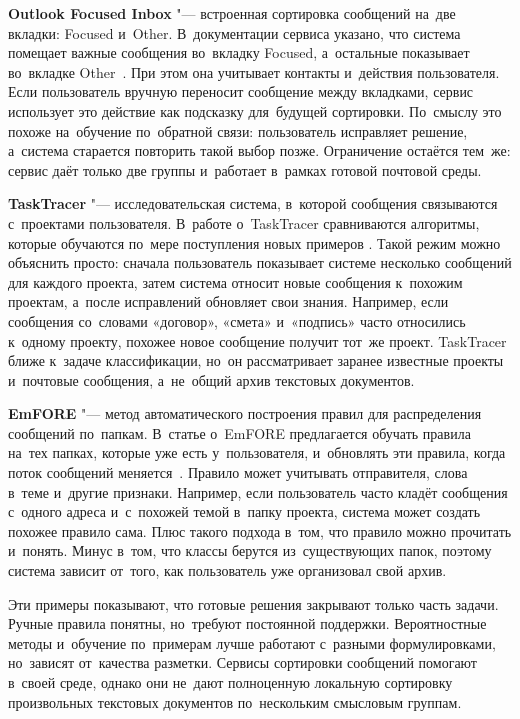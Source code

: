 \textbf{Outlook Focused Inbox} "--- встроенная сортировка сообщений на~две
вкладки: Focused и~Other. В~документации сервиса указано, что система
помещает важные сообщения во~вкладку Focused, а~остальные показывает
во~вкладке Other~\autocite{Microsoft2024FocusedInbox}. При этом она учитывает
контакты и~действия пользователя. Если пользователь вручную переносит
сообщение между вкладками, сервис использует это действие как подсказку
для~будущей сортировки. По~смыслу это похоже на~обучение по~обратной связи:
пользователь исправляет решение, а~система старается повторить такой выбор
позже. Ограничение остаётся тем~же: сервис даёт только две группы и~работает
в~рамках готовой почтовой среды.

\textbf{TaskTracer} "--- исследовательская система, в~которой сообщения
связываются с~проектами пользователя. В~работе о~TaskTracer сравниваются
алгоритмы, которые обучаются по~мере поступления новых примеров
\autocite{Keiser2009TaskTracer}. Такой режим можно объяснить просто: сначала
пользователь показывает системе несколько сообщений для каждого проекта, затем
система относит новые сообщения к~похожим проектам, а~после исправлений
обновляет свои знания. Например, если сообщения со~словами «договор»,
«смета» и~«подпись» часто относились к~одному проекту, похожее новое сообщение
получит тот~же проект. TaskTracer ближе к~задаче классификации, но~он
рассматривает заранее известные проекты и~почтовые сообщения, а~не~общий
архив текстовых документов.

\textbf{EmFORE} "--- метод автоматического построения правил для распределения
сообщений по~папкам. В~статье о~EmFORE предлагается обучать правила на~тех
папках, которые уже есть у~пользователя, и~обновлять эти правила, когда поток
сообщений меняется~\autocite{Singh2023EmFORE}. Правило может учитывать
отправителя, слова в~теме и~другие признаки. Например, если пользователь часто кладёт
сообщения с~одного адреса и~с~похожей темой в~папку проекта, система может
создать похожее правило сама. Плюс такого подхода в~том, что правило можно
прочитать и~понять. Минус в~том, что классы берутся из~существующих папок,
поэтому система зависит от~того, как пользователь уже организовал свой архив.

Эти примеры показывают, что готовые решения закрывают только часть задачи.
Ручные правила понятны, но~требуют постоянной поддержки. Вероятностные методы
и~обучение по~примерам лучше работают с~разными формулировками, но~зависят
от~качества разметки. Сервисы сортировки сообщений помогают в~своей среде,
однако они не~дают полноценную локальную сортировку произвольных текстовых
документов по~нескольким смысловым группам.

